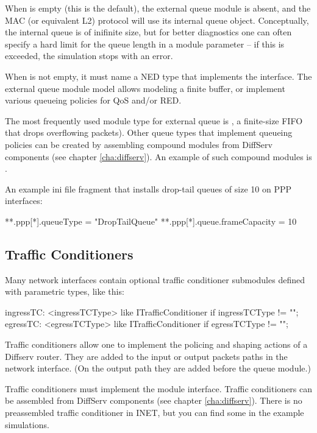 When  is empty (this is the default), the external queue
module is absent, and the MAC (or equivalent L2) protocol will use its
internal queue object. Conceptually, the internal queue is of inifinite size,
but for better diagnostics one can often specify a hard limit for the queue
length in a module parameter -- if this is exceeded, the simulation
stops with an error.

When  is not empty, it must name a NED type that
implements the  interface. The external
queue module model allows modeling a finite buffer, or implement
various queueing policies for QoS and/or RED.

The most frequently used module type for external queue is
, a finite-size FIFO that drops overflowing
packets). Other queue types that implement queueing policies can be
created by assembling compound modules from DiffServ components
(see chapter \ref{cha:diffserv}). An example of such compound
modules is .

An example ini file fragment that installs drop-tail queues of size 10
on PPP interfaces:

\begin{inifile}
**.ppp[*].queueType = "DropTailQueue"
**.ppp[*].queue.frameCapacity = 10
\end{inifile}

\subsection{Traffic Conditioners}
\label{sec:interfaces:traffic-conditioners}

Many network interfaces contain optional traffic conditioner submodules
defined with parametric types, like this:

\begin{ned}
ingressTC: <ingressTCType> like ITrafficConditioner if ingressTCType != "";
egressTC: <egressTCType> like ITrafficConditioner if egressTCType != "";
\end{ned}

Traffic conditioners allow one to implement the policing and shaping actions
of a Diffserv router. They are added to the input or output packets paths
in the network interface. (On the output path they are added before the queue
module.)

Traffic conditioners must implement the  module
interface. Traffic conditioners can be assembled from DiffServ components
(see chapter \ref{cha:diffserv}). There is no preassembled traffic conditioner
in INET, but you can find some in the example simulations.

